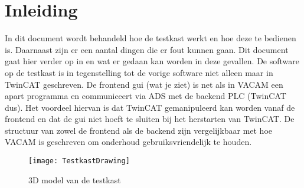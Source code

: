 \section{Inleiding}

In dit document wordt behandeld hoe de testkast werkt en hoe deze te bedienen is. Daarnaast zijn er een aantal dingen die er fout kunnen gaan. Dit document gaat hier verder op in en wat er gedaan kan worden in deze gevallen. De software op de testkast is in tegenstelling tot de vorige software niet alleen maar in \gls{TwinCAT} geschreven. De frontend \gls{gui} (wat je ziet) is net als in VACAM een apart programma en communiceert via \gls{ADS} met de backend \gls{PLC} (TwinCAT dus). Het voordeel hiervan is dat \gls{TwinCAT} gemanipuleerd kan worden vanaf de frontend en dat de \gls{gui} niet hoeft te sluiten bij het herstarten van \gls{TwinCAT}. De structuur van zowel de frontend als de backend zijn vergelijkbaar met hoe VACAM is geschreven om onderhoud gebruiksvriendelijk te houden.

\begin{figure}[H]
	\centering
	\texttt{[image: TestkastDrawing]}
	\label{fig:TestkastDrawing}
	\caption{3D model van de testkast}
\end{figure}